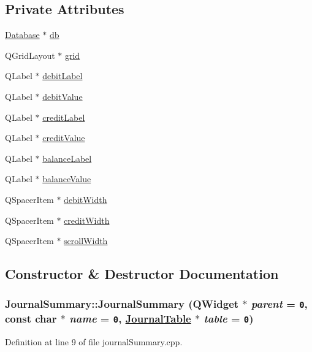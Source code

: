 \subsection*{Private Attributes}
\begin{CompactItemize}
\item 
\hyperlink{classDatabase}{Database} $\ast$ \hyperlink{classJournalSummary_r0}{db}
\item 
QGrid\-Layout $\ast$ \hyperlink{classJournalSummary_r1}{grid}
\item 
QLabel $\ast$ \hyperlink{classJournalSummary_r2}{debit\-Label}
\item 
QLabel $\ast$ \hyperlink{classJournalSummary_r3}{debit\-Value}
\item 
QLabel $\ast$ \hyperlink{classJournalSummary_r4}{credit\-Label}
\item 
QLabel $\ast$ \hyperlink{classJournalSummary_r5}{credit\-Value}
\item 
QLabel $\ast$ \hyperlink{classJournalSummary_r6}{balance\-Label}
\item 
QLabel $\ast$ \hyperlink{classJournalSummary_r7}{balance\-Value}
\item 
QSpacer\-Item $\ast$ \hyperlink{classJournalSummary_r8}{debit\-Width}
\item 
QSpacer\-Item $\ast$ \hyperlink{classJournalSummary_r9}{credit\-Width}
\item 
QSpacer\-Item $\ast$ \hyperlink{classJournalSummary_r10}{scroll\-Width}
\end{CompactItemize}


\subsection{Constructor \& Destructor Documentation}
\hypertarget{classJournalSummary_a0}{
\subsubsection[JournalSummary]{\setlength{\rightskip}{0pt plus 5cm}Journal\-Summary::Journal\-Summary (QWidget $\ast$ {\em parent} = {\tt 0}, const char $\ast$ {\em name} = {\tt 0}, \hyperlink{classJournalTable}{Journal\-Table} $\ast$ {\em table} = {\tt 0})}}
\label{classJournalSummary_a0}


Definition at line 9 of file journal\-Summary.cpp.

